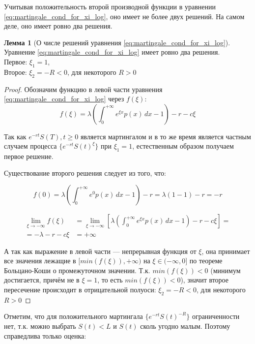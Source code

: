 \documentclass[a4paper,12pt]{article}
\theoremstyle{definition}
\newtheorem{lemma}{Лемма}
\begin{document}
Учитывая положительность второй производной функции в уравнении \eqref{eq:martingale_cond_for_xi_log}, оно имеет не более двух решений. На самом деле, оно имеет ровно два решения.
\begin{lemma}[О числе решений уравнения \eqref{eq:martingale_cond_for_xi_log}]\label{thm:solution_for_mart_cond_m1}
Уравнение \eqref{eq:martingale_cond_for_xi_log} имеет ровно два решения. \\
Первое: $\xi_1 = 1$, \\
Второе: $\xi_2 = -R < 0$, для некоторого $R > 0$
\end{lemma}
\begin{proof}
Обозначим функцию в левой части уравнения \eqref{eq:martingale_cond_for_xi_log} через $f(\xi)$:
\begin{equation*}
f(\xi) = \lambda \left(\int_{0}^{+\infty} e^{\xi x} p(x) \,dx - 1\right) - r - c\xi
\end{equation*}

Так как ${e^{-rt} S(T), t \ge 0}$ является мартингалом и в то же время является частным случаем процесса  $\{e^{-rt}S(t)^{\xi}\}$ при $\xi_1 = 1$, естественным образом получаем первое решение.

Существование второго решения следует из того, что:

\begin{equation*}
f(0) = \lambda \left(\int_{0}^{+\infty} e^{0} p(x) \,dx - 1\right) - r = \lambda (1 - 1) - r = -r
\end{equation*}

\begin{equation*}
\begin{split}
\lim_{\xi\to-\infty} f(\xi) &= \lim_{\xi\to-\infty} \left[ \lambda \left(\int_{0}^{+\infty} e^{\xi x} p(x) \,dx - 1\right) - r - c\xi \right] =\\
= - \lambda - r - c \xi &= +\infty
\end{split}
\end{equation*}

А так как выражение в левой части --- непрерывная функция от $\xi$, она принимает все значения лежащие в $[min(f(\xi)), +\infty)$ на $\xi \in (-\infty, 0]$ по теореме Больцано-Коши о промежуточном значении. Т.к. $min(f(\xi)) < 0$ (минимум достигается, причём не в $\xi = 1$, то есть $min(f(\xi)) < 0$), значит второе пересечение происходит в отрицательной полуоси: $\xi_2 = -R < 0$, для некоторого $R > 0$
\end{proof}

Отметим, что для положительного мартингала $\{e^{-rt} S(t)^{-R}\}$ ограниченности нет, т.к. можно выбрать $S(t) < L$ и $S(t)$ сколь угодно малым. Поэтому справедлива только оценка:
\end{document}
